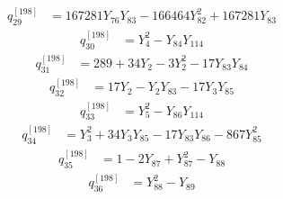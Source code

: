\begin{equation}\label{q198:row:029}
\begin{aligned}
q_{29}^{[198]} &={} 167281Y_{76}Y_{83} - 166464Y_{82}^{2} + 167281Y_{83}
\end{aligned}
\end{equation}
\begin{equation}\label{q198:row:030}
\begin{aligned}
q_{30}^{[198]} &={} Y_{4}^{2} - Y_{84}Y_{114}
\end{aligned}
\end{equation}
\begin{equation}\label{q198:row:031}
\begin{aligned}
q_{31}^{[198]} &={} 289 + 34Y_{2} - 3Y_{2}^{2} - 17Y_{83}Y_{84}
\end{aligned}
\end{equation}
\begin{equation}\label{q198:row:032}
\begin{aligned}
q_{32}^{[198]} &={} 17Y_{2} - Y_{2}Y_{83} - 17Y_{3}Y_{85}
\end{aligned}
\end{equation}
\begin{equation}\label{q198:row:033}
\begin{aligned}
q_{33}^{[198]} &={} Y_{5}^{2} - Y_{86}Y_{114}
\end{aligned}
\end{equation}
\begin{equation}\label{q198:row:034}
\begin{aligned}
q_{34}^{[198]} &={} Y_{3}^{2} + 34Y_{3}Y_{85} - 17Y_{83}Y_{86} - 867Y_{85}^{2}
\end{aligned}
\end{equation}
\begin{equation}\label{q198:row:035}
\begin{aligned}
q_{35}^{[198]} &={} 1 - 2Y_{87} + Y_{87}^{2} - Y_{88}
\end{aligned}
\end{equation}
\begin{equation}\label{q198:row:036}
\begin{aligned}
q_{36}^{[198]} &={} Y_{88}^{2} - Y_{89}
\end{aligned}
\end{equation}
